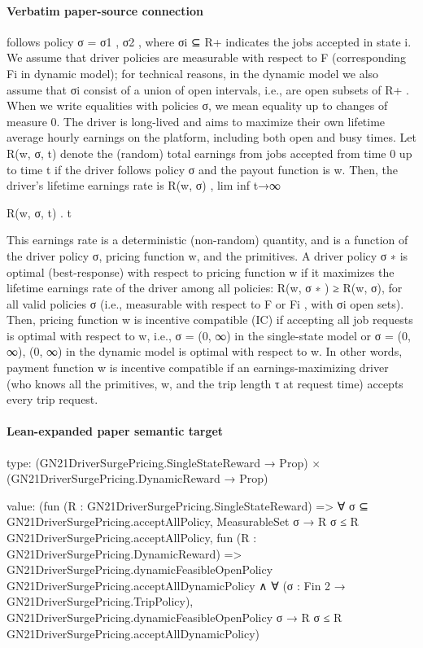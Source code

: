 \documentclass[10pt]{article}
\begin{document}
\paragraph{Verbatim paper-source connection}
\begin{ReviewVerbatim}
follows policy σ = {σ1 , σ2 }, where σi ⊆ R+ indicates the jobs accepted in state i. We assume that
driver policies are measurable with respect to F (corresponding Fi in dynamic model); for technical
reasons, in the dynamic model we also assume that σi consist of a union of open intervals, i.e., are
open subsets of R+ . When we write equalities with policies σ, we mean equality up to changes of
measure 0.
The driver is long-lived and aims to maximize their own lifetime average hourly earnings on the
platform, including both open and busy times. Let R(w, σ, t) denote the (random) total earnings
from jobs accepted from time 0 up to time t if the driver follows policy σ and the payout function
is w. Then, the driver’s lifetime earnings rate is
R(w, σ) , lim inf t→∞

R(w, σ, t)
.
t

This earnings rate is a deterministic (non-random) quantity, and is a function of the driver policy
σ, pricing function w, and the primitives.
A driver policy σ ∗ is optimal (best-response) with respect to pricing function w if it maximizes
the lifetime earnings rate of the driver among all policies: R(w, σ ∗ ) ≥ R(w, σ), for all valid policies
σ (i.e., measurable with respect to F or Fi , with σi open sets). Then, pricing function w is incentive
compatible (IC) if accepting all job requests is optimal with respect to w, i.e., σ = (0, ∞) in
the single-state model or σ = {(0, ∞), (0, ∞)} in the dynamic model is optimal with respect to w.
In other words, payment function w is incentive compatible if an earnings-maximizing driver (who
knows all the primitives, w, and the trip length τ at request time) accepts every trip request.
\end{ReviewVerbatim}



\paragraph{Lean-expanded paper semantic target}
\begin{ReviewVerbatim}
type:
(GN21DriverSurgePricing.SingleStateReward → Prop) × (GN21DriverSurgePricing.DynamicReward → Prop)

value:
(fun (R : GN21DriverSurgePricing.SingleStateReward) =>
  ∀ σ ⊆ GN21DriverSurgePricing.acceptAllPolicy, MeasurableSet σ → R σ ≤ R GN21DriverSurgePricing.acceptAllPolicy,
  fun (R : GN21DriverSurgePricing.DynamicReward) =>
  GN21DriverSurgePricing.dynamicFeasibleOpenPolicy GN21DriverSurgePricing.acceptAllDynamicPolicy ∧
    ∀ (σ : Fin 2 → GN21DriverSurgePricing.TripPolicy),
      GN21DriverSurgePricing.dynamicFeasibleOpenPolicy σ → R σ ≤ R GN21DriverSurgePricing.acceptAllDynamicPolicy)
\end{ReviewVerbatim}
\end{document}
